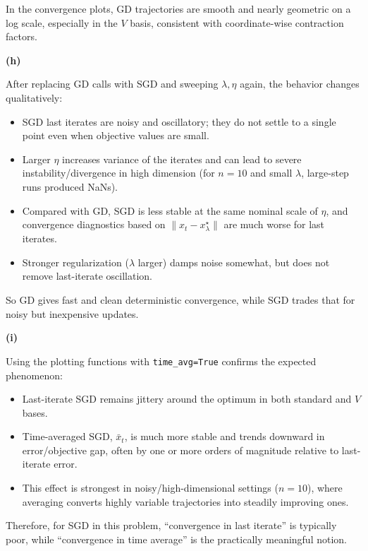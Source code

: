 \documentclass[
  12pt,
]{fphw}
\begin{document}
In the convergence plots, GD trajectories are smooth and nearly geometric on a log scale, especially in the $V$ basis, consistent with coordinate-wise contraction factors.

\textbf{(h)}

After replacing GD calls with SGD and sweeping $\lambda,\eta$ again, the behavior changes qualitatively:

\begin{itemize}
  \item SGD last iterates are noisy and oscillatory; they do not settle to a single point even when objective values are small.
  \item Larger $\eta$ increases variance of the iterates and can lead to severe instability/divergence in high dimension (for $n=10$ and small $\lambda$, large-step runs produced NaNs).
  \item Compared with GD, SGD is less stable at the same nominal scale of $\eta$, and convergence diagnostics based on $\|x_t-x_\lambda^\star\|$ are much worse for last iterates.
  \item Stronger regularization ($\lambda$ larger) damps noise somewhat, but does not remove last-iterate oscillation.
\end{itemize}

So GD gives fast and clean deterministic convergence, while SGD trades that for noisy but inexpensive updates.

\textbf{(i)}

Using the plotting functions with \texttt{time\_avg=True} confirms the expected phenomenon:

\begin{itemize}
  \item Last-iterate SGD remains jittery around the optimum in both standard and $V$ bases.
  \item Time-averaged SGD, $\bar{x}_t$, is much more stable and trends downward in error/objective gap, often by one or more orders of magnitude relative to last-iterate error.
  \item This effect is strongest in noisy/high-dimensional settings ($n=10$), where averaging converts highly variable trajectories into steadily improving ones.
\end{itemize}

Therefore, for SGD in this problem, ``convergence in last iterate'' is typically poor, while ``convergence in time average'' is the practically meaningful notion.
\newpage
\end{document}

